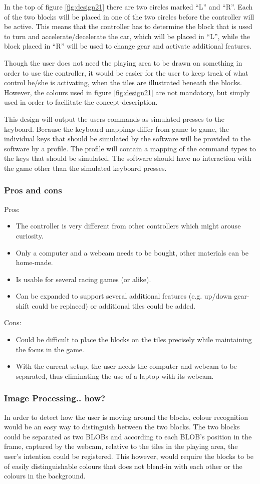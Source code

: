 In the top of figure \ref{fig:design21} there are two circles marked “L” and “R”. Each of the two blocks will be placed in one of the two circles before the controller will be active. This means that the controller has to determine the block that is used to turn and accelerate/decelerate the car, which will be placed in “L”, while the block placed in “R” will be used to change gear and activate additional features.

Though the user does not need the playing area to be drawn on something in order to use the controller, it would be easier for the user to keep track of what control he/she is activating, when the tiles are illustrated beneath the blocks. However, the colours used in figure \ref{fig:design21} are not mandatory, but simply used in order to facilitate the concept-description.
\bigskip

This design will output the users commands as simulated presses to the keyboard. 
Because the keyboard mappings differ from game to game, the individual keys that should be simulated by the software will be provided to the software by a profile.
The profile will contain a mapping of the command types to the keys that should be simulated. 
The software should have no interaction with the game other than the simulated keyboard presses.


\subsubsection*{Pros and cons}
Pros:
\begin{itemize}
\item The controller is very different from other controllers which might arouse curiosity.
\item Only a computer and a webcam needs to be bought, other materials can be home-made.
\item Is usable for several racing games (or alike).
\item Can be expanded to support several additional features (e.g. up/down gear-shift could be replaced) or additional tiles could be added.
\end{itemize}
Cons:
\begin{itemize}
\item Could be difficult to place the blocks on the tiles precisely while maintaining the focus in the game.
\item With the current setup, the user needs the computer and webcam to be separated, thus eliminating the use of a laptop with its webcam.
\end{itemize}

\subsubsection*{Image Processing.. how?}
In order to detect how the user is moving around the blocks, colour recognition would be an easy way to distinguish between the two blocks. The two blocks could be separated as two BLOBs and according to each BLOB’s position in the frame, captured by the webcam, relative to the tiles in the playing area, the user’s intention could be registered. This however, would require the blocks to be of easily distinguishable colours that does not blend-in with each other or the colours in the background.